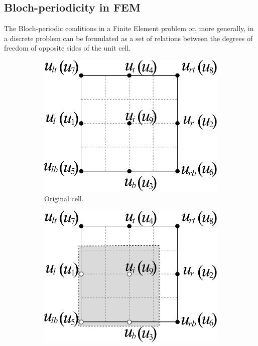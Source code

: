 \subsection{Bloch-periodicity in FEM}
The Bloch-periodic conditions in a Finite Element problem or, more generally, in a discrete problem can be formulated as a set of relations between the degrees of freedom of opposite sides of the unit cell.
\begin{figure}[h]
\centering
	\begin{subfigure}[b]{0.3\textwidth}
		\includegraphics[width=\textwidth]{cell_FEM.pdf}
		\caption{Original cell.}
	\end{subfigure}\quad
%
	\begin{subfigure}[b]{0.3\textwidth}\qquad
		\includegraphics[width=\textwidth]{cell_FEM-2.pdf}

\end{subfigure}
\end{figure}
